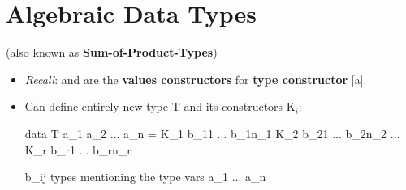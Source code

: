 \newpage
{}




\section{Algebraic Data Types}

(also known as \textbf{Sum-of-Product-Types})

\begin{itemize}
  \item \textit{Recall}: \codeline{[]} and \codeline{(:)} are the \textbf{values constructors} for \textbf{type constructor} [a]. 
  \item Can define entirely new type T and its constructors K$_i$:
        \begin{codebox}[haskell]
data T a_1 a_2 ... a_n = K_1 b_11 ... b_1n_1
                         K_2 b_21 ... b_2n_2
                         ...
                         K_r b_r1 ... b_rn_r
        \end{codebox}
        b\_ij types mentioning the type vars a\_1 ... a\_n


\end{itemize}
